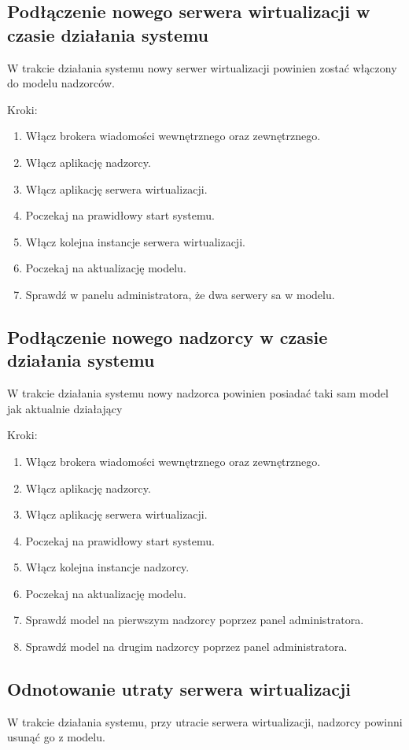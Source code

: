 \documentclass[12pt]{article}
\begin{document}
\subsection {Podłączenie nowego serwera wirtualizacji w czasie działania systemu}
W trakcie działania systemu nowy serwer wirtualizacji powinien zostać włączony do modelu nadzorców.

Kroki:
\begin{enumerate}
	\item Włącz brokera wiadomości wewnętrznego oraz zewnętrznego.
	\item Włącz aplikację nadzorcy.
	\item Włącz aplikację serwera wirtualizacji.
	\item Poczekaj na prawidłowy start systemu.
	\item Włącz kolejna instancje serwera wirtualizacji.
	\item Poczekaj na aktualizację modelu.
	\item Sprawdź w panelu administratora, że dwa serwery sa w modelu.
\end{enumerate}

\subsection {Podłączenie nowego nadzorcy w czasie działania systemu}
W trakcie działania systemu nowy nadzorca powinien posiadać taki sam model jak aktualnie działający

Kroki:
\begin{enumerate}
	\item Włącz brokera wiadomości wewnętrznego oraz zewnętrznego.
	\item Włącz aplikację nadzorcy.
	\item Włącz aplikację serwera wirtualizacji.
	\item Poczekaj na prawidłowy start systemu.
	\item Włącz kolejna instancje nadzorcy.
	\item Poczekaj na aktualizację modelu.
	\item Sprawdź model na pierwszym nadzorcy poprzez panel administratora.
	\item Sprawdź model na drugim nadzorcy poprzez panel administratora.
\end{enumerate}

\subsection {Odnotowanie utraty serwera wirtualizacji}
W trakcie działania systemu, przy utracie serwera wirtualizacji, nadzorcy powinni usunąć go z modelu.
\end{document}
